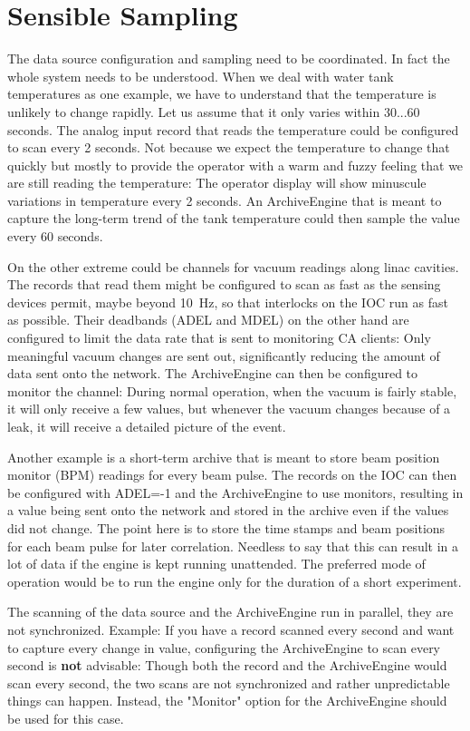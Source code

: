 \section{Sensible Sampling}
The data source configuration and sampling need to be coordinated.  In
fact the whole system needs to be understood. When we deal with water
tank temperatures as one example, we have to understand that the
temperature is unlikely to change rapidly. Let us assume that it only
varies within 30...60 seconds. The analog input record that reads the
temperature could be configured to scan every 2 seconds. Not because
we expect the temperature to change that quickly but mostly to provide
the operator with a warm and fuzzy feeling that we are still reading
the temperature: The operator display will show minuscule variations
in temperature every 2 seconds.  An ArchiveEngine that is meant to
capture the long-term trend of the tank temperature could then sample
the value every 60 seconds.

On the other extreme could be channels for vacuum readings along linac
cavities. The records that read them might be configured to scan as
fast as the sensing devices permit, maybe beyond 10~Hz, so that
interlocks on the IOC run as fast as possible. Their deadbands (ADEL
and MDEL) on the other hand are configured to limit the data rate that
is sent to monitoring CA clients: Only meaningful vacuum changes are
sent out, significantly reducing the amount of data sent onto the
network.  The ArchiveEngine can then be configured to monitor the
channel: During normal operation, when the vacuum is fairly stable, it
will only receive a few values, but whenever the vacuum changes
because of a leak, it will receive a detailed picture of the event.

Another example is a short-term archive that is meant to store
beam position monitor (BPM) readings for every beam pulse. The records
on the IOC can then be configured with ADEL=-1 and the ArchiveEngine
to use monitors, resulting in a value being sent onto the network and
stored in the archive even if the values did not change. The point
here is to store the time stamps and beam positions for each beam
pulse for later correlation. Needless to say that this can result in a
lot of data if the engine is kept running unattended. The preferred
mode of operation would be to run the engine only for the duration
of a short experiment.

\NOTE The scanning of the data source and the ArchiveEngine run in
parallel, they are not synchronized.
Example: If you have a record scanned every second and want to capture
every change in value, configuring the ArchiveEngine to scan every
second is {\bfseries not} advisable:
Though both the record and the ArchiveEngine would scan every
second, the two scans are not synchronized and rather unpredictable
things can happen. Instead, the "Monitor" option for the ArchiveEngine
should be used for this case.

